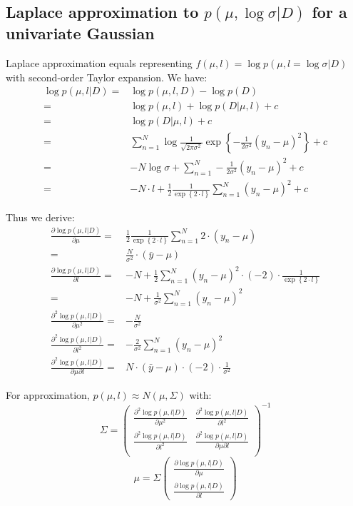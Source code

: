 \documentclass[UTF8]{ctexart}
\begin{document}
\subsection{Laplace approximation to $p(\mu,\log \sigma|D)$ for a univariate Gaussian}
Laplace approximation equals representing $f(\mu,l)=\log p(\mu,l=\log \sigma|D)$ with second-order Taylor expansion. We have:
\begin{align}
\log p(\mu,l|D)=&\log p(\mu,l,D)-\log p(D)\nonumber \\
=&\log p(\mu,l) + \log p(D|\mu,l) + c \nonumber \\
=&\log p(D|\mu,l) + c \nonumber \\
=&\sum_{n=1}^{N}\log \frac{1}{\sqrt{2\pi\sigma^{2}}}\exp\left\{-\frac{1}{2\sigma^{2}}(y_{n}-\mu)^{2}  \right\}+c \nonumber \\
=&-N\log \sigma+\sum_{n=1}^{N}-\frac{1}{2\sigma^{2}}(y_{n}-\mu)^{2}+c\nonumber \\
=&-N\cdot l+\frac{1}{2}\frac{1}{\exp\left\{2\cdot l\right\}}\sum_{n=1}^{N}(y_{n}-\mu)^{2}+c \nonumber
\end{align}

Thus we derive:
\begin{align}
\frac{\partial \log p(\mu,l|D)}{\partial \mu}=&\frac{1}{2}\frac{1}{\exp\left\{2\cdot l\right\}}\sum_{n=1}^{N}2\cdot (y_{n}-\mu) \nonumber \\
=&\frac{N}{\sigma^{2}}\cdot (\bar{y}-\mu)\nonumber \\
\frac{\partial \log p(\mu,l|D)}{\partial l}=&-N + \frac{1}{2}\sum_{n=1}^{N}(y_{n}-\mu)^{2}\cdot (-2)\cdot \frac{1}{\exp\left\{2\cdot l  \right\}} \nonumber \\
=&-N+\frac{1}{\sigma^{2}}\sum_{n=1}^{N}(y_{n}-\mu)^{2} \nonumber \\
\frac{\partial^{2} \log p(\mu,l|D)}{\partial \mu^{2}}=&-\frac{N}{\sigma^{2}} \nonumber \\
\frac{\partial^{2} \log p(\mu,l|D)}{\partial l^{2}}=&-\frac{2}{\sigma^{2}}\sum_{n=1}^{N}(y_{n}-\mu)^{2} \nonumber \\
\frac{\partial^{2} \log p(\mu,l|D)}{\partial \mu \partial l}=&N\cdot (\bar{y}-\mu)\cdot (-2) \cdot \frac{1}{\sigma^{2}} \nonumber
\end{align}

For approximation, $p(\mu,l) \approx N(\mu, \Sigma)$ with:
$$\Sigma = \begin{pmatrix} \frac{\partial^{2} \log p(\mu,l|D)}{\partial \mu^{2}} & \frac{\partial^{2} \log p(\mu,l|D)}{\partial l^{2}} \\ \frac{\partial^{2} \log p(\mu,l|D)}{\partial l^{2}} &  \frac{\partial^{2} \log p(\mu,l|D)}{\partial \mu \partial l} \\ \end{pmatrix}^{-1}$$
$$\mu = \Sigma \begin{pmatrix} \frac{\partial \log p(\mu,l|D)}{\partial \mu} \\ \frac{\partial \log p(\mu,l|D)}{\partial l}  \end{pmatrix}$$
\end{document}
